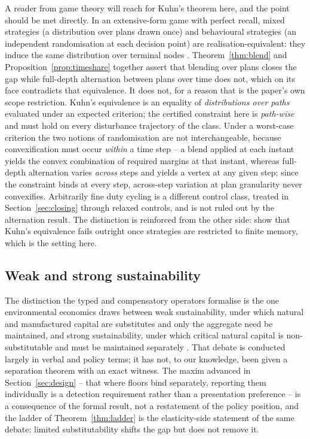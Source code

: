 \documentclass[preprint,11pt,authoryear]{elsarticle}
\theoremstyle{definition}
\theoremstyle{remark}
\begin{document}
A reader from game theory will reach for Kuhn's theorem here, and the point should be met directly. In an extensive-form game with perfect recall, mixed strategies (a distribution over plans drawn once) and behavioural strategies (an independent randomisation at each decision point) are realisation-equivalent: they induce the same distribution over terminal nodes \citep{Kuhn1953}. Theorem~\ref{thm:blend} and Proposition~\ref{prop:timeshare} together assert that blending over plans closes the gap while full-depth alternation between plans over time does not, which on its face contradicts that equivalence. It does not, for a reason that is the paper's own scope restriction. Kuhn's equivalence is an equality of \emph{distributions over paths} evaluated under an expected criterion; the certified constraint here is \emph{path-wise} and must hold on every disturbance trajectory of the class. Under a worst-case criterion the two notions of randomisation are not interchangeable, because convexification must occur \emph{within} a time step -- a blend applied at each instant yields the convex combination of required margins at that instant, whereas full-depth alternation varies \emph{across} steps and yields a vertex at any given step; since the constraint binds at every step, across-step variation at plan granularity never convexifies. Arbitrarily fine duty cycling is a different control class, treated in Section~\ref{sec:closing} through relaxed controls, and is not ruled out by the alternation result. The distinction is reinforced from the other side: \citet{MainRandour2024} show that Kuhn's equivalence fails outright once strategies are restricted to finite memory, which is the setting here.

\subsection{Weak and strong sustainability}

The distinction the typed and compensatory operators formalise is the one environmental economics draws between weak sustainability, under which natural and manufactured capital are substitutes and only the aggregate need be maintained, and strong sustainability, under which critical natural capital is non-substitutable and must be maintained separately \citep{PearceAtkinson1993,Beckerman1994,Daly1995,Ayres2001,Neumayer2013,DietzNeumayer2007}. That debate is conducted largely in verbal and policy terms; it has not, to our knowledge, been given a separation theorem with an exact witness. The maxim advanced in Section~\ref{sec:design} -- that where floors bind separately, reporting them individually is a detection requirement rather than a presentation preference -- is a consequence of the formal result, not a restatement of the policy position, and the ladder of Theorem~\ref{thm:ladder} is the elasticity-side statement of the same debate: limited substitutability shifts the gap but does not remove it.
\end{document}
